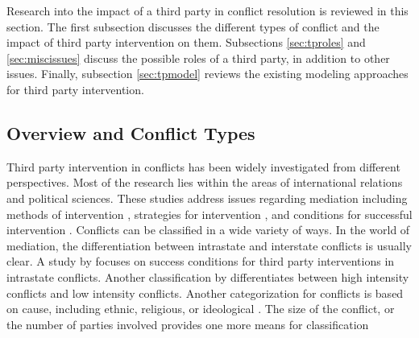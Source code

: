 \documentclass[letterpaper,12pt,titlepage,oneside,final]{book}
\begin{document}
Research into the impact of a third party in conflict resolution is reviewed in this section. The first subsection discusses the different types of conflict and the impact of third party intervention on them. Subsections \ref{sec:tproles} and \ref{sec:miscissues} discuss the possible roles of a third party, in addition to other issues. Finally, subsection \ref{sec:tpmodel} reviews the existing modeling approaches for third party intervention.

\subsection{Overview and Conflict Types}
\label{sec:ovrct}
Third party intervention in conflicts has been widely investigated from different perspectives. Most of the research lies within the areas of international relations and political sciences. These studies address  issues regarding mediation including methods of intervention \citep{fisher2001}, strategies for intervention \citep{prein1987}, and conditions for successful intervention \citep{regan1996}. 
Conflicts can be classified in a wide variety of ways. In the world of mediation, the differentiation between intrastate and interstate conflicts is usually clear. A study by \citet{regan1996} focuses on success conditions for third party interventions in intrastate conflicts. Another classification by \citet{bercovitch2006} differentiates between high intensity conflicts and low intensity conflicts. Another categorization for conflicts is based on cause, including ethnic, religious, or ideological \citep{regan1996}.  The size of the conflict, or the number of parties involved provides one more means for classification \citep{jehn1997}
\end{document}
